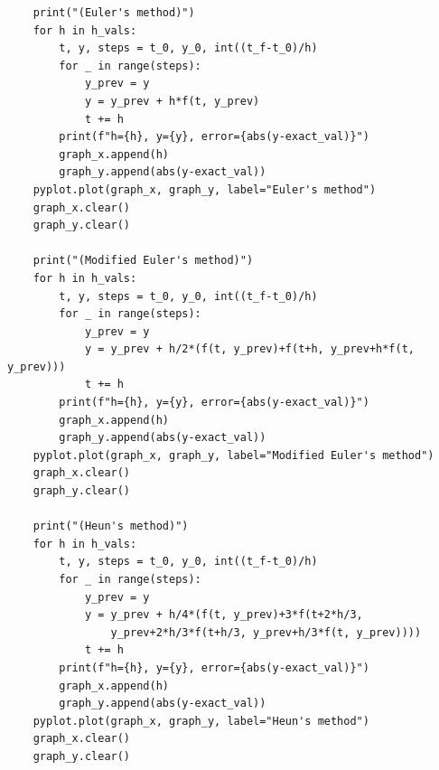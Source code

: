 \documentclass{article}
\begin{document}
\begin{itemize}
\begin{verbatim}
    print("(Euler's method)")
    for h in h_vals:
        t, y, steps = t_0, y_0, int((t_f-t_0)/h)
        for _ in range(steps):
            y_prev = y
            y = y_prev + h*f(t, y_prev)
            t += h
        print(f"h={h}, y={y}, error={abs(y-exact_val)}")
        graph_x.append(h)
        graph_y.append(abs(y-exact_val))
    pyplot.plot(graph_x, graph_y, label="Euler's method")
    graph_x.clear()
    graph_y.clear()
            
    print("(Modified Euler's method)")
    for h in h_vals:
        t, y, steps = t_0, y_0, int((t_f-t_0)/h)
        for _ in range(steps):
            y_prev = y
            y = y_prev + h/2*(f(t, y_prev)+f(t+h, y_prev+h*f(t, y_prev)))
            t += h
        print(f"h={h}, y={y}, error={abs(y-exact_val)}")
        graph_x.append(h)
        graph_y.append(abs(y-exact_val))
    pyplot.plot(graph_x, graph_y, label="Modified Euler's method")
    graph_x.clear()
    graph_y.clear()
            
    print("(Heun's method)")
    for h in h_vals:
        t, y, steps = t_0, y_0, int((t_f-t_0)/h)
        for _ in range(steps):
            y_prev = y
            y = y_prev + h/4*(f(t, y_prev)+3*f(t+2*h/3, 
                y_prev+2*h/3*f(t+h/3, y_prev+h/3*f(t, y_prev))))
            t += h
        print(f"h={h}, y={y}, error={abs(y-exact_val)}")
        graph_x.append(h)
        graph_y.append(abs(y-exact_val))
    pyplot.plot(graph_x, graph_y, label="Heun's method")
    graph_x.clear()
    graph_y.clear()
            

\end{verbatim}
\end{itemize}
\end{document}
